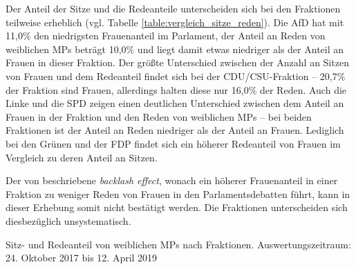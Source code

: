 \documentclass[12pt, 
    twoside=false, 
    bibliography=totoc, 
    numbers=endperiod, 
    headings=normal, 
    toc=chapterentrydotfill
    ]{scrbook}
\begin{document}
Der Anteil der Sitze und die Redeanteile unterscheiden sich bei den Fraktionen teilweise erheblich (vgl. Tabelle \ref{table:vergleich_sitze_reden}). Die AfD hat mit 11,0\% den niedrigsten Frauenanteil im Parlament, der Anteil an Reden von weiblichen MPs beträgt 10,0\% und liegt damit etwas niedriger als der Anteil an Frauen in dieser Fraktion. 
Der größte Unterschied zwischen der Anzahl an Sitzen von Frauen und dem Redeanteil findet sich bei der CDU/CSU-Fraktion -- 20,7\% der Fraktion sind Frauen, allerdings halten diese nur 16,0\% der Reden. Auch die Linke und die SPD zeigen einen deutlichen Unterschied zwischen dem Anteil an Frauen in der Fraktion und den Reden von weiblichen MPs -- bei beiden Fraktionen ist der Anteil an Reden niedriger als der Anteil an Frauen. Lediglich bei den Grünen und der FDP findet sich ein höherer Redeanteil von Frauen im Vergleich zu deren Anteil an Sitzen.

Der von \textcite{back_2018} beschriebene \emph{backlash effect}, wonach ein höherer Frauenanteil in einer Fraktion zu weniger Reden von Frauen in den Parlamentsdebatten führt, kann in dieser Erhebung somit nicht bestätigt werden. Die Fraktionen unterscheiden sich diesbezüglich unsystematisch.

\begin{table}[htb]
    \centering
    \caption[Sitz- und Redeanteil von weiblichen MPs nach Fraktionen]{Sitz- und Redeanteil von weiblichen MPs nach Fraktionen. Auswertungszeitraum: 24. Oktober 2017 bis 12. April 2019}
    
    \label{table:vergleich_sitze_reden}
\end{table}
\end{document}
